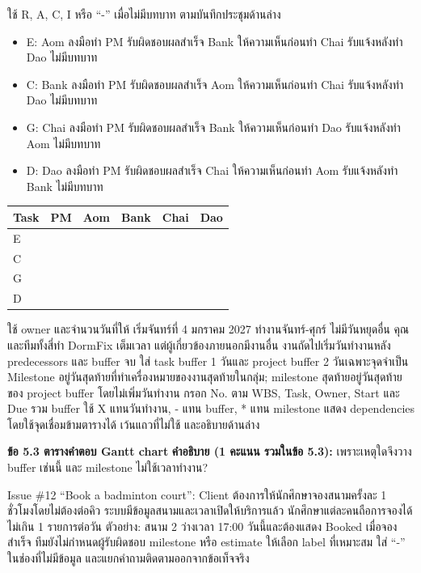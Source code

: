 \wbsgrid
{}
ใช้ R, A, C, I หรือ “-” เมื่อไม่มีบทบาท ตามบันทึกประชุมด้านล่าง\par
\begin{itemize}[itemsep=0pt]
\item E: Aom ลงมือทำ PM รับผิดชอบผลสำเร็จ Bank ให้ความเห็นก่อนทำ Chai รับแจ้งหลังทำ Dao ไม่มีบทบาท
\item C: Bank ลงมือทำ PM รับผิดชอบผลสำเร็จ Aom ให้ความเห็นก่อนทำ Chai รับแจ้งหลังทำ Dao ไม่มีบทบาท
\item G: Chai ลงมือทำ PM รับผิดชอบผลสำเร็จ Bank ให้ความเห็นก่อนทำ Dao รับแจ้งหลังทำ Aom ไม่มีบทบาท
\item D: Dao ลงมือทำ PM รับผิดชอบผลสำเร็จ Chai ให้ความเห็นก่อนทำ Aom รับแจ้งหลังทำ Bank ไม่มีบทบาท
\end{itemize}
\begin{tabularx}{\linewidth}{|M{1cm}|*{5}{>{\centering\arraybackslash}X|}}\hline
Task & PM & Aom & Bank & Chai & Dao\\\hline
E &\rule{0pt}{.7cm}&&&&\\\hline
C &\rule{0pt}{.7cm}&&&&\\\hline
G &\rule{0pt}{.7cm}&&&&\\\hline
D &\rule{0pt}{.7cm}&&&&\\\hline
\end{tabularx}
\newpage
{}
ใช้ owner และจำนวนวันที่ให้ เริ่มจันทร์ที่ 4 มกราคม 2027 ทำงานจันทร์-ศุกร์ ไม่มีวันหยุดอื่น คุณและทีมทั้งสี่ทำ DormFix เต็มเวลา แต่ผู้เกี่ยวข้องภายนอกมีงานอื่น งานถัดไปเริ่มวันทำงานหลัง predecessors และ buffer จบ ใส่ task buffer 1 วันและ project buffer 2 วันเฉพาะจุดจำเป็น Milestone อยู่วันสุดท้ายที่ทำเครื่องหมายของงานสุดท้ายในกลุ่ม; milestone สุดท้ายอยู่วันสุดท้ายของ project buffer โดยไม่เพิ่มวันทำงาน กรอก No. ตาม WBS, Task, Owner, Start และ Due รวม buffer ใช้ X แทนวันทำงาน, - แทน buffer, * แทน milestone แสดง dependencies โดยใช้จุดเชื่อมข้ามตารางได้ เว้นแถวที่ไม่ใช้ และอธิบายด้านล่าง\par
\textbf{ข้อ 5.3 ตารางคำตอบ Gantt chart}
\textbf{คำอธิบาย (1 คะแนน รวมในข้อ 5.3):} เพราะเหตุใดจึงวาง buffer เช่นนี้ และ milestone ไม่ใช้เวลาทำงาน?\par
\blankbox{2.2cm}
\newpage
{}
Issue \#12 “Book a badminton court”: Client ต้องการให้นักศึกษาจองสนามครั้งละ 1 ชั่วโมงโดยไม่ต้องต่อคิว ระบบมีข้อมูลสนามและเวลาเปิดให้บริการแล้ว นักศึกษาแต่ละคนถือการจองได้ไม่เกิน 1 รายการต่อวัน ตัวอย่าง: สนาม 2 ว่างเวลา 17:00 วันนี้และต้องแสดง Booked เมื่อจองสำเร็จ ทีมยังไม่กำหนดผู้รับผิดชอบ milestone หรือ estimate ให้เลือก label ที่เหมาะสม ใส่ “-” ในช่องที่ไม่มีข้อมูล และแยกคำถามติดตามออกจากข้อเท็จจริง\par
